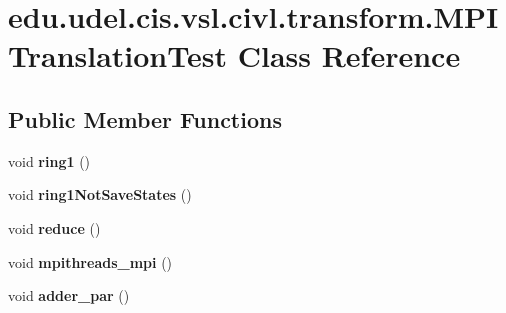 \hypertarget{classedu_1_1udel_1_1cis_1_1vsl_1_1civl_1_1transform_1_1MPITranslationTest}{}\section{edu.\+udel.\+cis.\+vsl.\+civl.\+transform.\+M\+P\+I\+Translation\+Test Class Reference}
\label{classedu_1_1udel_1_1cis_1_1vsl_1_1civl_1_1transform_1_1MPITranslationTest}
\subsection*{Public Member Functions}
\begin{DoxyCompactItemize}
\item 
\hypertarget{classedu_1_1udel_1_1cis_1_1vsl_1_1civl_1_1transform_1_1MPITranslationTest_a34021544a7b19bba6c9c361f9aeb3c75}{}void {\bfseries ring1} ()\label{classedu_1_1udel_1_1cis_1_1vsl_1_1civl_1_1transform_1_1MPITranslationTest_a34021544a7b19bba6c9c361f9aeb3c75}

\item 
\hypertarget{classedu_1_1udel_1_1cis_1_1vsl_1_1civl_1_1transform_1_1MPITranslationTest_aa14754f34b9e0245668b23ac09916a2e}{}void {\bfseries ring1\+Not\+Save\+States} ()\label{classedu_1_1udel_1_1cis_1_1vsl_1_1civl_1_1transform_1_1MPITranslationTest_aa14754f34b9e0245668b23ac09916a2e}

\item 
\hypertarget{classedu_1_1udel_1_1cis_1_1vsl_1_1civl_1_1transform_1_1MPITranslationTest_af4780562c464d9536a4c1eee3b848b90}{}void {\bfseries reduce} ()\label{classedu_1_1udel_1_1cis_1_1vsl_1_1civl_1_1transform_1_1MPITranslationTest_af4780562c464d9536a4c1eee3b848b90}

\item 
\hypertarget{classedu_1_1udel_1_1cis_1_1vsl_1_1civl_1_1transform_1_1MPITranslationTest_affbd99818e9ae09a1082c58aacde587f}{}void {\bfseries mpithreads\+\_\+mpi} ()\label{classedu_1_1udel_1_1cis_1_1vsl_1_1civl_1_1transform_1_1MPITranslationTest_affbd99818e9ae09a1082c58aacde587f}

\item 
\hypertarget{classedu_1_1udel_1_1cis_1_1vsl_1_1civl_1_1transform_1_1MPITranslationTest_aa611c1882f52b8da4a1ed9b78eae99c6}{}void {\bfseries adder\+\_\+par} ()\label{classedu_1_1udel_1_1cis_1_1vsl_1_1civl_1_1transform_1_1MPITranslationTest_aa611c1882f52b8da4a1ed9b78eae99c6}


\end{DoxyCompactItemize}
